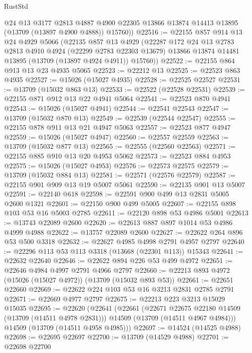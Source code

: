 \begin{lexlean}{RustStd}
\begin{coremodule}
        @24
        @13
        @3177
        @2813
        @4887
        @4900
        @22305
        @13866
        @13874
        @14413
        @13895
        (@13709 (@13897 @4900 @4888))
        @15760))
@22516 := @22155
    @857
    @914
    @13
    @24
    @4929
    @5066
    (@22135
      @857
      @13
      @4929
      (@22287
        @172
        @24
        @13
        @2783
        @2813
        @4910
        @4924
        (@22299 @2783 @22303 @13679)
        @13866
        @13874
        @14481
        @13895
        (@13709 (@13897 @4924 @4911))
        @15760))
@22522 := @22155 @864 @913 @13 @23 @4935 @5065
@22523 := @22212 @13
@22525 := @22523 @863 @4935
@22527 := @15026 (@15027 @4935)
@22528 := @22525 @22527
@22531 := @13709 (@15032 @863 @13)
@22533 := @22522 (@22528 @22531)
@22539 := @22155 @871 @912 @13 @22 @4941 @5064
@22541 := @22523 @870 @4941
@22543 := @15026 (@15027 @4941)
@22544 := @22541 @22543
@22547 := @13709 (@15032 @870 @13)
@22549 := @22539 (@22544 @22547)
@22555 := @22155 @878 @911 @13 @21 @4947 @5063
@22557 := @22523 @877 @4947
@22559 := @15026 (@15027 @4947)
@22560 := @22557 @22559
@22563 := @13709 (@15032 @877 @13)
@22565 := @22555 (@22560 @22563)
@22571 := @22155 @885 @910 @13 @20 @4953 @5062
@22573 := @22523 @884 @4953
@22575 := @15026 (@15027 @4953)
@22576 := @22573 @22575
@22579 := @13709 (@15032 @884 @13)
@22581 := @22571 (@22576 @22579)
@22587 := @22155 @901 @909 @13 @19 @5007 @5061
@22590 := @22135 @901 @13 @5007
@22591 := @22140 @618
@22598 := @22591 @900 @499 @13 @2831 @5005 @2600 @1321
@22601 := @22150 @900 @499 @5005
@22607 := @22155 @898 @103 @53 @16 @5003 @2785
@22611 := @22120 @898 @53 @4986 @5001
@22613 := @13743 @22089 @2600
@22620 := @22613 @887 @897 @1014 @53 @4986 @4999 @4988
@22622 := @13757 @22089 @2600
@22627 := @22622 @264 @896 @53 @500 @3318
@22632 := @22627 @4985 @4998 @2791 @4957 @2797
@22640 := @22296 @113 @53 @113 @3318 (@13668 (@22301 @113)) @15343
@22641 := @22632 @22640
@22646 := @22622 @894 @226 @53 @499 @4972
@22651 := @22646 @4984 @4997 @2791 @4966 @2797
@22660 := @22213 @893 @4972 (@15026 (@15027 @4972)) (@13709 (@15032 @893 @53))
@22661 := @22651 @22660
@22669 := @22622 @224 @103 @53 @16 @3213 @2831 @2785 @2791
@22671 := @22669 @4977 @2797
@22675 := @22213 @223 @3213 @15029 @15035
@22695 := @22620
    (@22641
      (@22661
        (@22671 @22675 @22180 @14509 (@13709 (@14511 @4978 @2831)))
        @14509
        (@13709 (@14511 @4967 @4984)))
      @14509
      (@13709 (@14511 @4958 @4985)))
@22697 := @14524 (@14525 @4988)
@22698 := @22695 @22697
@22700 := @13709 (@14529 @4988)
@22701 := @22698 @22700

\end{coremodule}
\end{lexlean}
